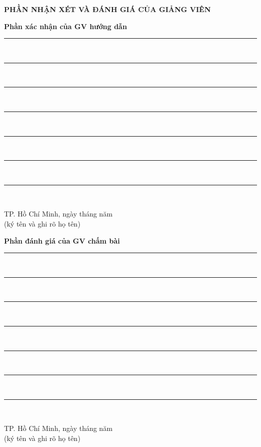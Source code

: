 \documentclass{report}
\newcommand\tab[1][1.25cm]{\hspace*{#1}}
\begin{document}
\begin{center}
	\fontsize{16}{20}\selectfont
	\textbf{PHẦN NHẬN XÉT VÀ ĐÁNH GIÁ CỦA GIẢNG VIÊN}\\
\end{center}
\fontsize{13}{14}\selectfont
\textbf{Phần xác nhận của GV hướng dẫn}\\
\rule{17cm}{1pt}\\
\rule{17cm}{1pt}\\
\rule{17cm}{1pt}\\
\rule{17cm}{1pt}\\
\rule{17cm}{1pt}\\
\rule{17cm}{1pt}\\
\rule{17cm}{1pt}\\
\begin{flushright}
	TP. Hồ Chí Minh, ngày \tab[1cm] tháng \tab[1cm] năm \tab[1cm]\tab \\
	(ký tên và ghi rõ họ tên)\tab[2cm] \\
	\vspace{2cm}
\end{flushright}
\fontsize{13}{14}\selectfont
\textbf{Phần đánh giá của GV chấm bài}\\
\rule{17cm}{1pt}\\
\rule{17cm}{1pt}\\
\rule{17cm}{1pt}\\
\rule{17cm}{1pt}\\
\rule{17cm}{1pt}\\
\rule{17cm}{1pt}\\
\rule{17cm}{1pt}\\
\begin{flushright}
	TP. Hồ Chí Minh, ngày \tab[1cm] tháng \tab[1cm] năm \tab[1cm]\tab \\
	(ký tên và ghi rõ họ tên)\tab[2cm] \\
	\vspace{1.5cm}
\end{flushright}
\pagebreak


\fontsize{13}{15}\selectfont

\pagebreak

\fontsize{13}{20}\selectfont
\tableofcontents
\pagebreak
\end{document}
